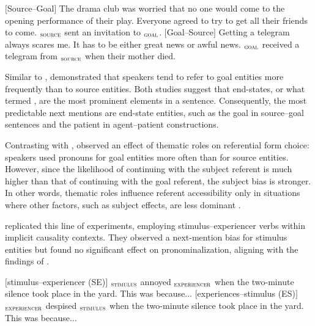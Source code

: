 \begin{exe}
	\ex
	\begin{xlist}
		\ex $[$Source--Goal$]$ The drama club was worried that no one would come to the opening performance
		of their play. Everyone agreed to try to get all their friends to come. $_{\textsc{source}}$
		sent an invitation to $_{\textsc{goal}}$.  \label{ex:source_goal}
		\ex $[$Goal--Source$]$ Getting a telegram always scares me. It has to be either great news or awful
		news. $_{\textsc{goal}}$ received a telegram from $_{\textsc{source}}$ when their mother died. \label{ex:goal_source}
	\end{xlist}
\end{exe}

Similar to \citet{Stevenson1994}, \citet{Arnold2001} demonstrated that speakers tend to refer to goal entities more frequently than to source entities. Both studies suggest that end-states, or what \citeauthor{Stevenson1994} termed , are the most prominent elements in a sentence. Consequently, the most predictable next mentions are end-state entities, such as the goal in source--goal sentences and the patient in agent--patient constructions. 

Contrasting with \citeauthor{Stevenson1994}, \citeauthor{Arnold2001} observed an effect of thematic roles on referential form choice: speakers used pronouns for goal entities more often than for source entities. However, since the likelihood of continuing with the subject referent is much higher than that of continuing with the goal referent, the subject bias is stronger. In other words, thematic roles influence referent accessibility only in situations where other factors, such as subject effects, are less dominant \citep{Arnold2001}.

\citet{Fukumura2010} replicated this line of experiments, employing stimulus--experiencer verbs within implicit causality contexts. They observed a next-mention bias for stimulus entities but found no significant effect on pronominalization, aligning with the findings of \citet{Stevenson1994}. 

\ea
	\ea $[$stimulus--experiencer (SE)$]$ $_{\textsc{stimulus}}$
	annoyed $_{\textsc{experiencer}}$ when the two-minute silence
	took place in the yard. This was because...\label{ex:SE}
	\ex $[$experiences--stimulus (ES)$]$ $_{\textsc{experiencer}}$
	despised $_{\textsc{stimulus}}$ when the two-minute silence
	took place in the yard. This was because...\label{ex:ES}
	\z
\z

